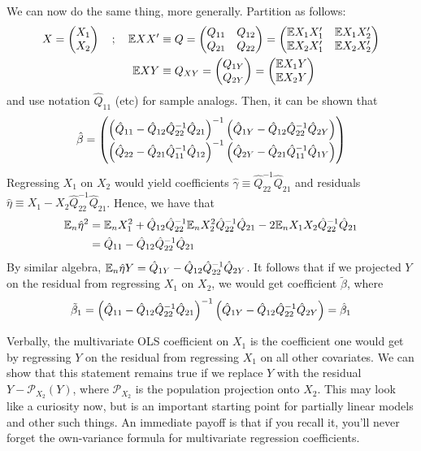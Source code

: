 \documentclass[10pt]{article}
\begin{document}
\begin{example}
	 We can now do the same thing, more generally. Partition as follows:
	\begin{align*}
		X = \begin{pmatrix}X_1 \\ X_2\end{pmatrix} \quad;\quad \mathbb{E} XX' &\equiv Q = \begin{pmatrix}Q_{11} & Q_{12} \\Q_{21} & Q_{22}\end{pmatrix} = \begin{pmatrix}\mathbb{E} X_1 X_1' & \mathbb{E} X_1 X_2' \\ \mathbb{E} X_2 X_1' & \mathbb{E} X_2 X_2'\end{pmatrix} \\
		\mathbb{E} XY &\equiv Q_{XY} = \begin{pmatrix}Q_{1Y} \\ Q_{2Y}\end{pmatrix} = \begin{pmatrix}\mathbb{E} X_1Y \\ \mathbb{E} X_2Y\end{pmatrix}
	\end{align*}
	and use notation $\hat{Q}_{11}$ (etc) for sample analogs. Then, it can be shown that
	\[
	\hat{\beta} = \begin{pmatrix}\left( \hat{Q}_{11} - \hat{Q}_{12}\hat{Q}_{22}^{-1}\hat{Q}_{21}\right)^{-1} \left( \hat{Q}_{1Y} - \hat{Q}_{12}\hat{Q}_{22}^{-1}\hat{Q}_{2Y}\right) \\ \left( \hat{Q}_{22} - \hat{Q}_{21}\hat{Q}_{11}^{-1}\hat{Q}_{12}\right)^{-1} \left( \hat{Q}_{2Y} - \hat{Q}_{21}\hat{Q}_{11}^{-1}\hat{Q}_{1Y}\right)\end{pmatrix}
	\]
	Regressing $X_1$ on $X_2$ would yield coefficients $\hat{\gamma} \equiv \hat{Q}_{22}^{-1}\hat{Q}_{21}$ and residuals $\hat{\eta} \equiv X_1 - X_2 \hat{Q}_{22}^{-1}\hat{Q}_{21}$. Hence, we have that \begin{align*} \mathbb{E}_n \hat{\eta}^2 &= \mathbb{E}_n X_1^2 + \hat{Q}_{12}\hat{Q}_{22}^{-1}\mathbb{E}_n X_2^2  \hat{Q}_{22}^{-1}\hat{Q}_{21} - 2\mathbb{E}_n X_1X_2  \hat{Q}_{22}^{-1}\hat{Q}_{21} \\ &= \hat{Q}_{11} - \hat{Q}_{12} \hat{Q}_{22}^{-1}\hat{Q}_{21}\end{align*} By similar algebra, $\mathbb{E}_n \hat{\eta}Y = \hat{Q}_{1Y} -  \hat{Q}_{12}\hat{Q}_{22}^{-1}\hat{Q}_{2Y}$. It follows that if we projected $Y$ on the residual from regressing $X_1$ on $X_2$, we would get coefficient $\tilde{\beta}$, where
	\[
	\tilde{\beta}_1 = \left( \hat{Q}_{11} - \hat{Q}_{12} \hat{Q}_{22}^{-1}\hat{Q}_{21}\right)^{-1}\left( \hat{Q}_{1Y} - \hat{Q}_{12} \hat{Q}_{22}^{-1}\hat{Q}_{2Y}\right) = \hat{\beta}_1
	\] 
	
	\begin{remark}
		Verbally, the multivariate OLS coefficient on $X_1$ is the coefficient one would get by regressing $Y$ on the residual from regressing $X_1$ on all other covariates. We can show that this statement remains true if we replace $Y$ with the residual $Y - \mathcal{P}_{X_2}(Y)$, where $\mathcal{P}_{X_2}$ is the population projection onto $X_2$. This may look like a curiosity now, but is an important starting point for partially linear models and other such things. An immediate payoff is that if you recall it, you'll never forget the own-variance formula for multivariate regression coefficients.
	\end{remark}
\end{example}
\end{document}
